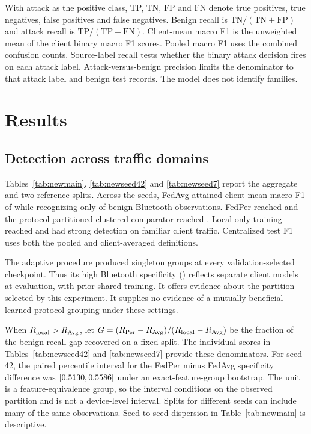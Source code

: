 \documentclass[nolineno]{ieeeaccess}
\begin{document}
With attack as the positive class, TP, TN, FP and FN denote true positives, true negatives, false positives and false negatives. Benign recall is $\mathrm{TN}/(\mathrm{TN}+\mathrm{FP})$ and attack recall is $\mathrm{TP}/(\mathrm{TP}+\mathrm{FN})$. Client-mean macro F1 is the unweighted mean of the client binary macro F1 scores. Pooled macro F1 uses the combined confusion counts. Source-label recall tests whether the binary attack decision fires on each attack label. Attack-versus-benign precision limits the denominator to that attack label and benign test records. The model does not identify families.

\section{Results}\label{sec:results}
\subsection{Detection across traffic domains}
Tables~\ref{tab:newmain}, \ref{tab:newseed42} and \ref{tab:newseed7} report the aggregate and two reference splits. Across the \RevisionSeeds{} seeds, FedAvg attained client-mean macro F1 of \RevisionAvgF{} while recognizing only \RevisionAvgB{} of benign Bluetooth observations. FedPer reached \RevisionPerB{} and the protocol-partitioned clustered comparator reached \RevisionFixedB{}. Local-only training reached \RevisionLocalB{} and had strong detection on familiar client traffic. Centralized test F1 uses both the pooled and client-averaged definitions.

The adaptive procedure produced singleton groups at every validation-selected checkpoint. Thus its high Bluetooth specificity (\RevisionAdaptiveB{}) reflects separate client models at evaluation, with prior shared training. It offers evidence about the partition selected by this experiment. It supplies no evidence of a mutually beneficial learned protocol grouping under these settings.

When $R_{\rm local}>R_{\rm Avg}$, let $G=(R_{\rm Per}-R_{\rm Avg})/(R_{\rm local}-R_{\rm Avg})$ be the fraction of the benign-recall gap recovered on a fixed split. The individual scores in Tables~\ref{tab:newseed42} and \ref{tab:newseed7} provide these denominators. For seed 42, the paired percentile interval for the FedPer minus FedAvg specificity difference was $[0.5130,0.5586]$ under an exact-feature-group bootstrap. The unit is a feature-equivalence group, so the interval conditions on the observed partition and is not a device-level interval. Splits for different seeds can include many of the same observations. Seed-to-seed dispersion in Table~\ref{tab:newmain} is descriptive.
\end{document}
